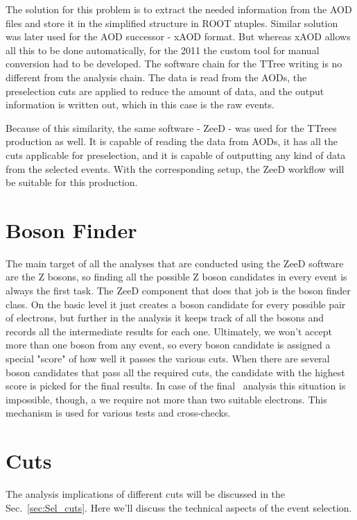 The solution for this problem is to extract the needed information from the AOD files and store it in the simplified structure in ROOT ntuples. Similar solution was later used for the AOD successor - xAOD format. But whereas xAOD allows all this to be done automatically, for the 2011 the custom tool for manual conversion had to be developed. The software chain for the TTree writing is no different from the analysis chain. The data is read from the AODs, the preselection cuts are applied to reduce the amount of data, and the output information is written out, which in this case is the raw events.

Because of this similarity, the same software - ZeeD - was used for the TTrees production as well. It is capable of reading the data from AODs, it has all the cuts applicable for preselection, and it is capable of outputting any kind of data from the selected events. With the corresponding setup, the ZeeD workflow will be suitable for this production.

\section{Boson Finder}

The main target of all the analyses that are conducted using the ZeeD software are the Z bosons, so finding all the possible Z boson candidates in every event is always the first task. The ZeeD component that does that job is the boson finder class. On the basic level it just creates a boson candidate for every possible pair of electrons, but further in the analysis it keeps track of all the bosons and records all the intermediate results for each one. Ultimately, we won't accept more than one boson from any event, so every boson candidate is assigned a special "score" of how well it passes the various cuts. When there are several boson candidates that pass all the required cuts, the candidate with the highest score is picked for the final results. In case of the final \Zee\ analysis this situation is impossible, though, a we require not more than two suitable electrons. This mechanism is used for various tests and cross-checks.

\section{Cuts}

The analysis implications of different cuts will be discussed in the Sec.~\ref{sec:Sel_cuts}. Here we'll discuss the technical aspects of the event selection.

